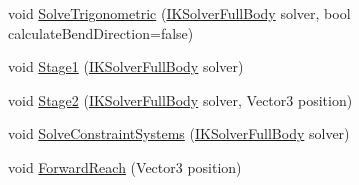\begin{DoxyCompactItemize}
\item 
void \mbox{\hyperlink{class_root_motion_1_1_final_i_k_1_1_f_b_i_k_chain_a02a04f84e5fc0c66cda70ffc7207ba2b}{Solve\+Trigonometric}} (\mbox{\hyperlink{class_root_motion_1_1_final_i_k_1_1_i_k_solver_full_body}{I\+K\+Solver\+Full\+Body}} solver, bool calculate\+Bend\+Direction=false)
\item 
void \mbox{\hyperlink{class_root_motion_1_1_final_i_k_1_1_f_b_i_k_chain_a5d7b8f6e941cf4d392d6018d7a985add}{Stage1}} (\mbox{\hyperlink{class_root_motion_1_1_final_i_k_1_1_i_k_solver_full_body}{I\+K\+Solver\+Full\+Body}} solver)
\item 
void \mbox{\hyperlink{class_root_motion_1_1_final_i_k_1_1_f_b_i_k_chain_a1d328994fe5179453233c2857618ee20}{Stage2}} (\mbox{\hyperlink{class_root_motion_1_1_final_i_k_1_1_i_k_solver_full_body}{I\+K\+Solver\+Full\+Body}} solver, Vector3 position)
\item 
void \mbox{\hyperlink{class_root_motion_1_1_final_i_k_1_1_f_b_i_k_chain_ad6df73725445c8cb869119224261b336}{Solve\+Constraint\+Systems}} (\mbox{\hyperlink{class_root_motion_1_1_final_i_k_1_1_i_k_solver_full_body}{I\+K\+Solver\+Full\+Body}} solver)
\item 
void \mbox{\hyperlink{class_root_motion_1_1_final_i_k_1_1_f_b_i_k_chain_a7f0450c9a98d8866883efe7b5f1fa9dc}{Forward\+Reach}} (Vector3 position)
\end{DoxyCompactItemize}

